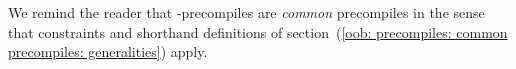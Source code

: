 We remind the reader that \blsDataMod{}-precompiles are \emph{common} precompiles in the sense that constraints and shorthand definitions of
section~(\ref{oob: precompiles: common precompiles: generalities})
apply.
